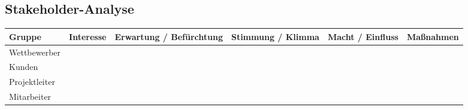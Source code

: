 

\begin{landscape}
\begin{center}
\section{Stakeholder-Analyse}


\begin{tabulary}{1.3\textwidth}{|L|L|L|L|L|L|}
\hline 
\textbf{Gruppe} & \textbf{Interesse} & \textbf{Erwartung / Befürchtung} & \textbf{Stimmung / Klimma} & \textbf{Macht / Einfluss} & \textbf{Maßnahmen} \\ 
\hline 
Wettbewerber &&&&&\\ 
\hline 
Kunden &&&&&\\ 
\hline 
Projektleiter &&&&& \\ 
\hline 
Mitarbeiter &&&&& \\ 
\hline 
\end{tabulary} 
\end{center}
\end{landscape}
\restoregeometry